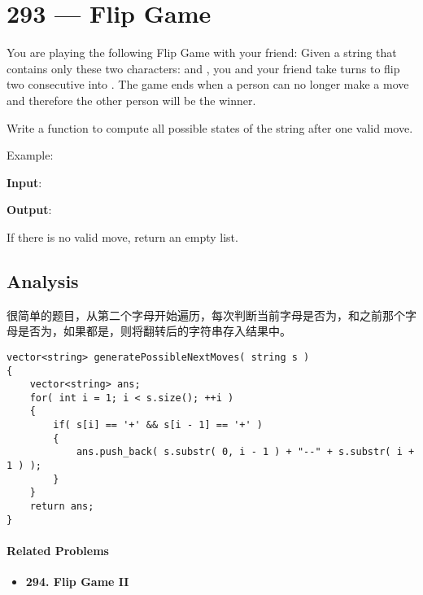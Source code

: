 \section{293 --- Flip Game }
You are playing the following Flip Game with your friend: Given a string that contains only these two characters:  and , you and your friend take turns to flip two consecutive  into . The game ends when a person can no longer make a move and therefore the other person will be the winner.

Write a function to compute all possible states of the string after one valid move.

\begin{flushleft}
Example:

\textbf{Input}: 

\textbf{Output}: 

  
  
\end{flushleft}

If there is no valid move, return an empty list.
\subsection{Analysis}
很简单的题目，从第二个字母开始遍历，每次判断当前字母是否为，和之前那个字母是否为，如果都是，则将翻转后的字符串存入结果中。
\setcounter{lstlisting}{0}
\begin{lstlisting}[style=customc, caption={Loop}]
vector<string> generatePossibleNextMoves( string s )
{
    vector<string> ans;
    for( int i = 1; i < s.size(); ++i )
    {
        if( s[i] == '+' && s[i - 1] == '+' )
        {
            ans.push_back( s.substr( 0, i - 1 ) + "--" + s.substr( i + 1 ) );
        }
    }
    return ans;
}
\end{lstlisting}

\paragraph{Related Problems}
\begin{itemize}
\item \textbf{294. Flip Game II}
\end{itemize}